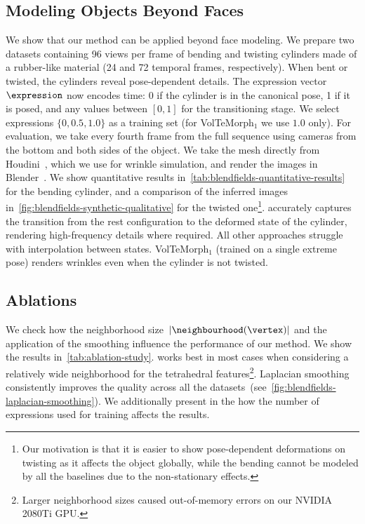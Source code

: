   \subsection{Modeling Objects Beyond Faces}
    We show that our method can be applied beyond face modeling.
    We prepare two datasets containing 96 views per frame of bending and
    twisting cylinders made of a rubber-like material (24 and 72 temporal
    frames, respectively).
    When bent or twisted, the cylinders reveal pose-dependent details.
    The expression vector $\expression$ now encodes time: 0 if the cylinder is
    in the canonical pose, 1 if it is posed, and any values between $[0, 1]$
    for the transitioning stage.
    We select expressions $\{0, 0.5, 1.0\}$ as a training set (for
    VolTeMorph$_1$ we use $1.0$ only).
    For evaluation, we take every fourth frame from the full sequence using
    cameras from the bottom and both sides of the object.
    We take the mesh directly from Houdini~\cite{xu2014houdini}, which we use
    for wrinkle simulation, and render the images in
    Blender~\cite{blender2022}.
    We show quantitative results
    in~\cref{tab:blendfields-quantitative-results} for the bending cylinder,
    and a comparison of the inferred images
    in~\cref{fig:blendfields-synthetic-qualitative} for the twisted
    one\footnote{Our motivation is that it is easier to show pose-dependent
    deformations on twisting as it affects the object globally, while the
    bending cannot be modeled by all the baselines due to the non-stationary
    effects.
    }. \blendfields accurately captures the transition from the rest configuration to the deformed state of the cylinder, rendering high-frequency details where required.
    All other approaches struggle with interpolation between states.
    VolTeMorph$_1$ (trained on a single extreme pose) renders wrinkles even
    when the cylinder is not twisted.

  \subsection{Ablations}
    We check how the neighborhood size~$|\neighbourhood(\vertex)|$ and the
    application of the smoothing influence the performance of our method.
    We show the results in~\cref{tab:ablation-study}.
    \blendfields works best in most cases when considering a relatively wide neighborhood for the tetrahedral features\footnote{Larger neighborhood sizes caused out-of-memory errors on our NVIDIA 2080Ti GPU.}.
    Laplacian smoothing consistently improves the quality across all the
    datasets~(see~\cref{fig:blendfields-laplacian-smoothing}).
    We additionally present in the \supplementary{} how the number of
    expressions used for training affects the results.

